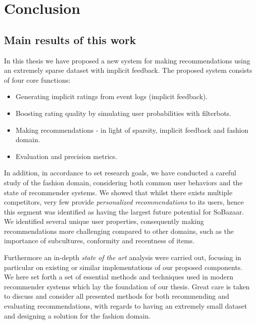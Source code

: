 
\chapter{Conclusion}
\label{chap:conclusion}

\section{Main results of this work}

In this thesis we have proposed a new system for making recommendations using
an extremely sparse dataset with implicit feedback. The proposed system
consists of four core functions:

\begin{itemize}
	\item Generating implicit ratings from event logs (implicit feedback).
	\item Boosting rating quality by simulating user probabilities with filterbots.
	\item Making recommendations - in light of sparsity, implicit feedback and
	fashion domain.
	\item Evaluation and precision metrics.
\end{itemize}

In addition, in accordance to set research goals, we have conducted a careful
study of the fashion domain, considering both common user behaviors and the
state of recommender systems. We showed that whilst there exists multiple
competitors, very few provide \textit{personalized recommendations} to its
users, hence this segment was identified as having the largest future potential
for SoBazaar. We identified several unique user properties, consequently making
recommendations more challenging compared to other domains, such as the
importance of subcultures, conformity and recentness of items.

Furthermore an in-depth \textit{state of the art} analysis were carried out,
focusing in particular on existing or similar implementations of our proposed
components. We here set forth a set of essential methods and techniques used in
modern recommender systems which lay the foundation of our thesis.  Great care
is taken to discuss and consider all presented methods for both recommending
and evaluating recommendations, with regards to having an extremely small
dataset and designing a solution for the fashion domain.

